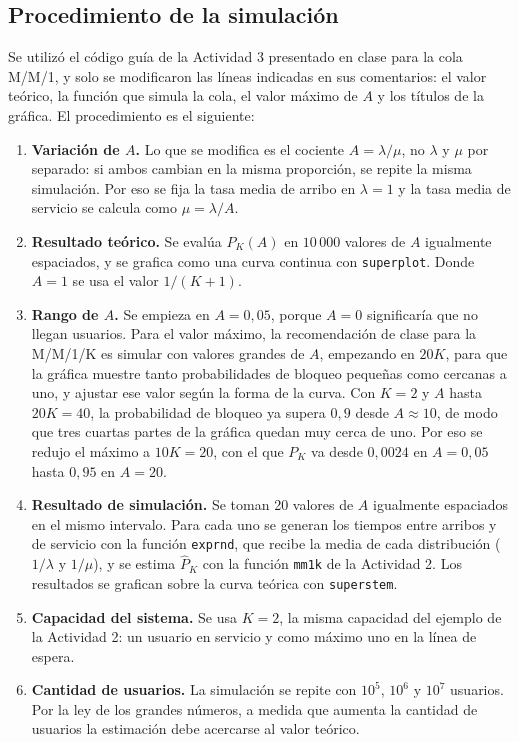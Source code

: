 \documentclass[12pt]{article}
\begin{document}
\subsection{Procedimiento de la simulación}

Se utilizó el código guía de la Actividad 3 presentado en clase para la cola M/M/1, y solo se modificaron las líneas indicadas en sus comentarios: el valor teórico, la función que simula la cola, el valor máximo de $A$ y los títulos de la gráfica. El procedimiento es el siguiente:

\begin{enumerate}
    \item \textbf{Variación de $A$.} Lo que se modifica es el cociente $A=\lambda/\mu$, no $\lambda$ y $\mu$ por separado: si ambos cambian en la misma proporción, se repite la misma simulación. Por eso se fija la tasa media de arribo en $\lambda=1$ y la tasa media de servicio se calcula como $\mu=\lambda/A$.
    \item \textbf{Resultado teórico.} Se evalúa $P_K(A)$ en $10\,000$ valores de $A$ igualmente espaciados, y se grafica como una curva continua con \texttt{superplot}. Donde $A=1$ se usa el valor $1/(K+1)$.
    \item \textbf{Rango de $A$.} Se empieza en $A=0{,}05$, porque $A=0$ significaría que no llegan usuarios. Para el valor máximo, la recomendación de clase para la M/M/1/K es simular con valores grandes de $A$, empezando en $20K$, para que la gráfica muestre tanto probabilidades de bloqueo pequeñas como cercanas a uno, y ajustar ese valor según la forma de la curva. Con $K=2$ y $A$ hasta $20K=40$, la probabilidad de bloqueo ya supera $0{,}9$ desde $A\approx 10$, de modo que tres cuartas partes de la gráfica quedan muy cerca de uno. Por eso se redujo el máximo a $10K=20$, con el que $P_K$ va desde $0{,}0024$ en $A=0{,}05$ hasta $0{,}95$ en $A=20$.
    \item \textbf{Resultado de simulación.} Se toman 20 valores de $A$ igualmente espaciados en el mismo intervalo. Para cada uno se generan los tiempos entre arribos y de servicio con la función \texttt{exprnd}, que recibe la media de cada distribución ($1/\lambda$ y $1/\mu$), y se estima $\hat{P}_K$ con la función \texttt{mm1k} de la Actividad 2. Los resultados se grafican sobre la curva teórica con \texttt{superstem}.
    \item \textbf{Capacidad del sistema.} Se usa $K=2$, la misma capacidad del ejemplo de la Actividad 2: un usuario en servicio y como máximo uno en la línea de espera.
    \item \textbf{Cantidad de usuarios.} La simulación se repite con $10^5$, $10^6$ y $10^7$ usuarios. Por la ley de los grandes números, a medida que aumenta la cantidad de usuarios la estimación debe acercarse al valor teórico.
\end{enumerate}
\end{document}
